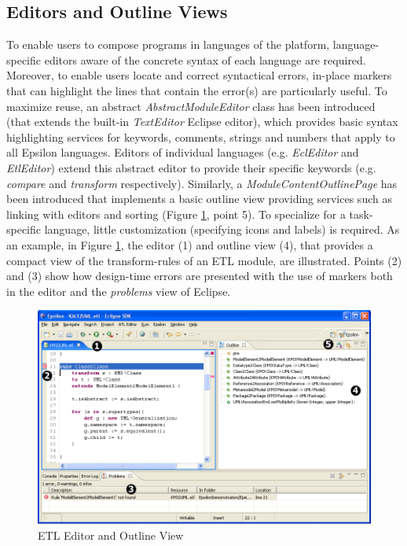 \subsection{Editors and Outline Views}
To enable users to compose programs in languages of the platform, language-specific editors aware of the concrete syntax of each language are required. Moreover, to enable users locate and correct syntactical errors, in-place markers that can highlight the lines that contain the error(s) are particularly useful. To maximize reuse, an abstract \emph{AbstractModuleEditor} class has been introduced (that extends the built-in \emph{TextEditor} Eclipse editor), which provides basic syntax highlighting services for keywords, comments, strings and numbers that apply to all Epsilon languages. Editors of individual languages (e.g. \emph{EclEditor} and \emph{EtlEditor}) extend this abstract editor to provide their specific keywords (e.g. \emph{compare} and \emph{transform} respectively). Similarly, a \emph{ModuleContentOutlinePage} has been introduced that implements a basic outline view providing services such as linking with editors and sorting (Figure \ref{fig:EditorAndOutline}, point 5). To specialize for a task-specific language, little customization (specifying icons and labels) is required. As an example, in Figure \ref{fig:EditorAndOutline}, the editor (1) and outline view (4), that provides a compact view of the transform-rules of an ETL module, are illustrated. Points (2) and (3) show how design-time errors are presented with the use of markers both in the editor and the \textit{problems} view of Eclipse.

\begin{landscape}
\begin{figure}
	\centering
		\includegraphics[width=20cm]{images/EditorAndOutline.png}
	\caption{ETL Editor and Outline View}
	\label{fig:EditorAndOutline}
\end{figure}
\end{landscape}

